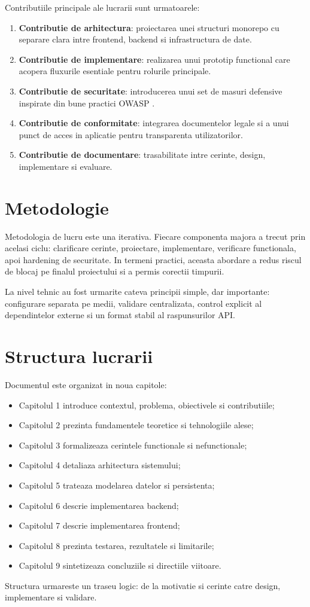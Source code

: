 Contributiile principale ale lucrarii sunt urmatoarele:
\begin{enumerate}[leftmargin=1.2cm]
    \item \textbf{Contributie de arhitectura}: proiectarea unei structuri monorepo cu separare clara intre frontend, backend si infrastructura de date.
    \item \textbf{Contributie de implementare}: realizarea unui prototip functional care acopera fluxurile esentiale pentru rolurile principale.
    \item \textbf{Contributie de securitate}: introducerea unui set de masuri defensive inspirate din bune practici OWASP \parencite{owasp2021top10}.
    \item \textbf{Contributie de conformitate}: integrarea documentelor legale si a unui punct de acces in aplicatie pentru transparenta utilizatorilor.
    \item \textbf{Contributie de documentare}: trasabilitate intre cerinte, design, implementare si evaluare.
\end{enumerate}

\section{Metodologie}

Metodologia de lucru este una iterativa. Fiecare componenta majora a trecut prin acelasi ciclu: clarificare cerinte, proiectare, implementare, verificare functionala, apoi hardening de securitate. In termeni practici, aceasta abordare a redus riscul de blocaj pe finalul proiectului si a permis corectii timpurii.

La nivel tehnic au fost urmarite cateva principii simple, dar importante: configurare separata pe medii, validare centralizata, control explicit al dependintelor externe si un format stabil al raspunsurilor API.

\section{Structura lucrarii}

Documentul este organizat in noua capitole:
\begin{itemize}[leftmargin=1.2cm]
    \item Capitolul 1 introduce contextul, problema, obiectivele si contributiile;
    \item Capitolul 2 prezinta fundamentele teoretice si tehnologiile alese;
    \item Capitolul 3 formalizeaza cerintele functionale si nefunctionale;
    \item Capitolul 4 detaliaza arhitectura sistemului;
    \item Capitolul 5 trateaza modelarea datelor si persistenta;
    \item Capitolul 6 descrie implementarea backend;
    \item Capitolul 7 descrie implementarea frontend;
    \item Capitolul 8 prezinta testarea, rezultatele si limitarile;
    \item Capitolul 9 sintetizeaza concluziile si directiile viitoare.
\end{itemize}

Structura urmareste un traseu logic: de la motivatie si cerinte catre design, implementare si validare.
